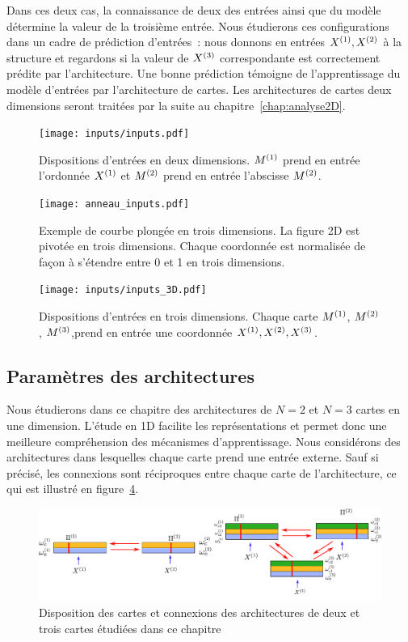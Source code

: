 \documentclass[../main]{subfiles}
\begin{document}
Dans ces deux cas, la connaissance de deux des entrées ainsi que du modèle détermine la valeur de la troisième entrée. 
Nous étudierons ces configurations dans un cadre de prédiction d'entrées~: nous donnons en entrées $X^{({1})}, X^{({2})}$ à la structure et regardons si la valeur de $X^{({3})}$ correspondante est correctement prédite par l'architecture. 
Une bonne prédiction témoigne de l'apprentissage du modèle d'entrées par l'architecture de cartes.
Les architectures de cartes deux dimensions seront traitées par la suite au chapitre~\ref{chap:analyse2D}.

\begin{figure}
	\texttt{[image: inputs/inputs.pdf]}
	\caption{Dispositions d'entrées en deux dimensions. $M^{({1})}$ prend en entrée l'ordonnée $X^{({1})}$ et $M^{({2})}$ prend en entrée l'abscisse $M^{({2})}$. \label{fig:input_list}}
\end{figure}

\begin{figure}
	\centering\texttt{[image: anneau\_inputs.pdf]}
	\caption{Exemple de courbe plongée en trois dimensions. La figure 2D est pivotée en trois dimensions. Chaque coordonnée est normalisée de façon à s'étendre entre 0 et 1 en trois dimensions.
	\label{fig:in_3D}}
\end{figure}

\begin{figure}
	\texttt{[image: inputs/inputs\_3D.pdf]}
	\caption{Dispositions d'entrées en trois dimensions. Chaque carte $M^{({1})}$, $M^{({2})}$, $M^{({3})}$,prend en entrée une coordonnée $X^{({1})}, X^{({2})}, X^{({3})}$. \label{fig:inputs_3D}}
\end{figure}

\subsection{Paramètres des architectures}

Nous étudierons dans ce chapitre des architectures de $N = 2$ et $N=3$ cartes en une dimension. L'étude en 1D facilite les représentations et permet donc une meilleure compréhension des mécanismes d'apprentissage.
Nous considérons des architectures dans lesquelles chaque carte prend une entrée externe. 
Sauf si précisé, les connexions sont réciproques entre chaque carte de l'architecture, ce qui est illustré en figure~\ref{fig:archis}.

\begin{figure}
	\includegraphics[width=\textwidth]{archis.pdf}
	\caption{Disposition des cartes et connexions des architectures de deux et trois cartes étudiées dans ce chapitre \label{fig:archis}}
\end{figure}
\end{document}

